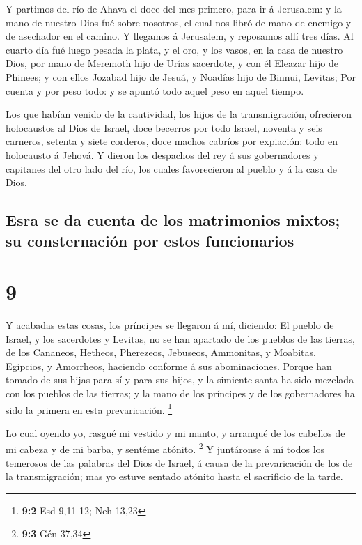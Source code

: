  Y partimos del río de Ahava el doce del mes primero,
para ir á Jerusalem: y la mano de nuestro Dios fué sobre nosotros, el
cual nos libró de mano de enemigo y de asechador en el camino.
 Y llegamos á Jerusalem, y reposamos allí tres días.
 Al cuarto día fué luego pesada la plata, y el oro, y los
vasos, en la casa de nuestro Dios, por mano de Meremoth hijo de Urías
sacerdote, y con él Eleazar hijo de Phinees; y con ellos Jozabad hijo de
Jesuá, y Noadías hijo de Binnui, Levitas;  Por cuenta y
por peso todo: y se apuntó todo aquel peso en aquel tiempo.

 Los que habían venido de la cautividad, los hijos de la
transmigración, ofrecieron holocaustos al Dios de Israel, doce becerros
por todo Israel, noventa y seis carneros, setenta y siete corderos, doce
machos cabríos por expiación: todo en holocausto á Jehová.
 Y dieron los despachos del rey á sus gobernadores y
capitanes del otro lado del río, los cuales favorecieron al pueblo y á
la casa de Dios.

\hypertarget{esra-se-da-cuenta-de-los-matrimonios-mixtos-su-consternaciuxf3n-por-estos-funcionarios}{%
\subsection{Esra se da cuenta de los matrimonios mixtos; su
consternación por estos
funcionarios}\label{esra-se-da-cuenta-de-los-matrimonios-mixtos-su-consternaciuxf3n-por-estos-funcionarios}}

\hypertarget{section-8}{%
\section{9}\label{section-8}}

 Y acabadas estas cosas, los príncipes se llegaron á mí,
diciendo: El pueblo de Israel, y los sacerdotes y Levitas, no se han
apartado de los pueblos de las tierras, de los Cananeos, Hetheos,
Pherezeos, Jebuseos, Ammonitas, y Moabitas, Egipcios, y Amorrheos,
haciendo conforme á sus abominaciones.  Porque han tomado
de sus hijas para sí y para sus hijos, y la simiente santa ha sido
mezclada con los pueblos de las tierras; y la mano de los príncipes y de
los gobernadores ha sido la primera en esta prevaricación. \footnote{\textbf{9:2}
  Esd 9,11-12; Neh 13,23}

 Lo cual oyendo yo, rasgué mi vestido y mi manto, y
arranqué de los cabellos de mi cabeza y de mi barba, y sentéme atónito.
\footnote{\textbf{9:3} Gén 37,34}  Y juntáronse á mí todos
los temerosos de las palabras del Dios de Israel, á causa de la
prevaricación de los de la transmigración; mas yo estuve sentado atónito
hasta el sacrificio de la tarde.

